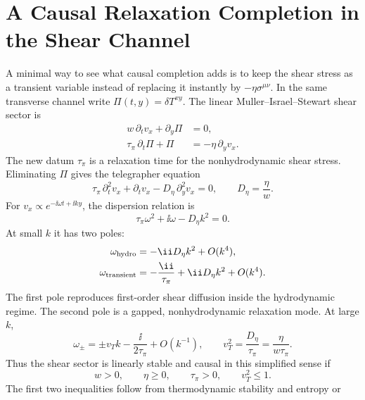 \section{A Causal Relaxation Completion in the Shear Channel}
\label{sec:hydro-causal-shear-relaxation}

A minimal way to see what causal completion adds is to keep the shear stress
as a transient variable instead of replacing it instantly by
\(-\eta\sigma^{\mu\nu}\).  In the same transverse channel write
\(\Pi(t,y)=\delta T^{xy}\).  The linear Muller--Israel--Stewart shear sector is
\begin{align}
  w\,\partial_t v_x+\partial_y\Pi&=0,
  \label{eq:hydro-mis-shear-momentum}\\
  \tau_\pi\,\partial_t\Pi+\Pi&=-\eta\,\partial_yv_x .
  \label{eq:hydro-mis-shear-relaxation}
\end{align}
The new datum \(\tau_\pi\) is a relaxation time for the nonhydrodynamic shear
stress.  Eliminating \(\Pi\) gives the telegrapher equation
\begin{equation}
  \tau_\pi\,\partial_t^2v_x+\partial_tv_x
  -D_\eta\,\partial_y^2v_x=0,
  \qquad D_\eta=\frac{\eta}{w}.
  \label{eq:hydro-mis-shear-telegrapher}
\end{equation}
For \(v_x\propto e^{-\ii\omega t+\ii ky}\), the dispersion relation is
\begin{equation}
  \tau_\pi\omega^2+\ii\omega-D_\eta k^2=0.
  \label{eq:hydro-mis-shear-dispersion}
\end{equation}
At small \(k\) it has two poles:
\begin{align}
  \omega_{\rm hydro}
  &=
  -\ii D_\eta k^2+O(k^4),
  \label{eq:hydro-mis-hydrodynamic-shear-pole}\\
  \omega_{\rm transient}
  &=
  -\frac{\ii}{\tau_\pi}
  +\ii D_\eta k^2+O(k^4).
  \label{eq:hydro-mis-transient-shear-pole}
\end{align}
The first pole reproduces first-order shear diffusion inside the hydrodynamic
regime.  The second pole is a gapped, nonhydrodynamic relaxation mode.  At
large \(k\),
\[
  \omega_\pm
  =
  \pm v_T k-\frac{\ii}{2\tau_\pi}+O(k^{-1}),
  \qquad
  v_T^2=\frac{D_\eta}{\tau_\pi}
  =
  \frac{\eta}{w\tau_\pi}.
\]
Thus the shear sector is linearly stable and causal in this simplified sense
if
\begin{equation}
  w>0,\qquad
  \eta\ge0,\qquad
  \tau_\pi>0,\qquad
  v_T^2\le1 .
  \label{eq:hydro-mis-shear-stability-conditions}
\end{equation}
The first two inequalities follow from thermodynamic stability and entropy or
